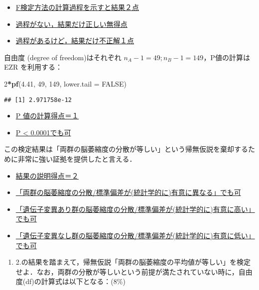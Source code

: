 \documentclass[11pt,]{problemset}
\newenvironment{Shaded}{\begin{snugshade}}{\end{snugshade}}
\newcommand{\DataTypeTok}[1]{\textcolor[rgb]{0.13,0.29,0.53}{#1}}
\newcommand{\DecValTok}[1]{\textcolor[rgb]{0.00,0.00,0.81}{#1}}
\newcommand{\FloatTok}[1]{\textcolor[rgb]{0.00,0.00,0.81}{#1}}
\newcommand{\KeywordTok}[1]{\textcolor[rgb]{0.13,0.29,0.53}{\textbf{#1}}}
\newcommand{\NormalTok}[1]{#1}
\newcommand{\OperatorTok}[1]{\textcolor[rgb]{0.81,0.36,0.00}{\textbf{#1}}}
\newcommand{\OtherTok}[1]{\textcolor[rgb]{0.56,0.35,0.01}{#1}}
\providecommand{\tightlist}{%
  \setlength{\itemsep}{0pt}\setlength{\parskip}{0pt}}
\begin{document}
\begin{itemize}
\item
  \underline{F検定方法の計算過程を示すと結果２点}
\item
  \underline{過程がない，結果だけ正しい無得点}
\item
  \underline{過程があるけど，結果だけ不正解１点}
\end{itemize}

自由度 (degree of freedom)はそれぞれ
\(n_A - 1 = 49; n_B -1 = 149\)，P値の計算は EZR を利用する：

\begin{Shaded}
\begin{Highlighting}[]
\DecValTok{2}\OperatorTok{*}\KeywordTok{pf}\NormalTok{(}\FloatTok{4.41}\NormalTok{, }\DecValTok{49}\NormalTok{, }\DecValTok{149}\NormalTok{, }\DataTypeTok{lower.tail =} \OtherTok{FALSE}\NormalTok{)}
\end{Highlighting}
\end{Shaded}

\begin{verbatim}
## [1] 2.971758e-12
\end{verbatim}

\begin{itemize}
\item
  \underline{P 値の計算得点＝１}
\item
  \underline{P < 0.0001でも可}
\end{itemize}

この検定結果は「両群の脳萎縮度の分散が等しい」という帰無仮説を棄却するために非常に強い証拠を提供したと言える．

\begin{itemize}
\item
  \underline{結果の説明得点＝２}
\item
  \underline{「両群の脳萎縮度の分散/標準偏差が(統計学的に)有意に異なる」でも可}
\item
  \underline{「遺伝子変異あり群の脳萎縮度の分散/標準偏差が(統計学的に)有意に高い」でも可}
\item
  \underline{「遺伝子変異なし群の脳萎縮度の分散/標準偏差が(統計学的に)有意に低い」でも可}
\end{itemize}

\begin{enumerate}
\def\labelenumi{\arabic{enumi}.}
\setcounter{enumi}{2}
\tightlist
\item
  2.の結果を踏まえて，帰無仮説「両群の脳萎縮度の平均値が等しい」を検定せよ．なお，両群の分散が等しいという前提が満たされていない時に，自由度(df)の計算式は以下となる：(8\%)
\end{enumerate}
\end{document}
